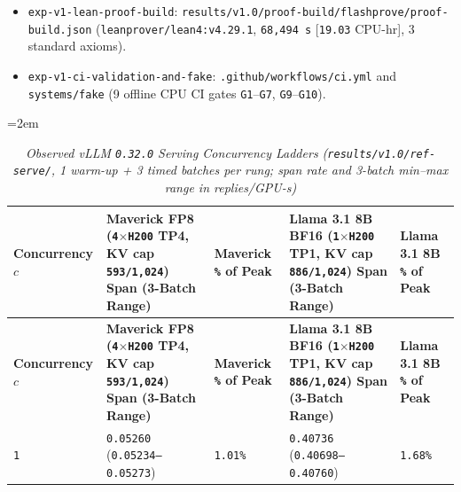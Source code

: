 \documentclass[11pt,letterpaper]{article}
\begin{document}
\begin{itemize}
\item \texttt{exp-\allowbreak{}v1-\allowbreak{}lean-\allowbreak{}proof-\allowbreak{}build}: \texttt{results/\allowbreak{}v1.0/\allowbreak{}proof-\allowbreak{}build/\allowbreak{}flashprove/\allowbreak{}proof-\allowbreak{}build.\allowbreak{}json} (\texttt{leanprover/\allowbreak{}lean4:\allowbreak{}v4.29.1}, \texttt{68,494 s} [\texttt{19.03} CPU-hr], 3 standard axioms).
\item \texttt{exp-\allowbreak{}v1-\allowbreak{}ci-\allowbreak{}validation-\allowbreak{}and-\allowbreak{}fake}: \texttt{.\allowbreak{}github/\allowbreak{}workflows/\allowbreak{}ci.\allowbreak{}yml} and \texttt{systems/\allowbreak{}fake} (9 offline CPU CI gates \texttt{G1}--\texttt{G7}, \texttt{G9}--\texttt{G10}).
\end{itemize}

{\footnotesize\setlength{\tabcolsep}{4pt}\emergencystretch=2em
\begin{longtable}{@{}>{\raggedright\arraybackslash}p{} >{\raggedright\arraybackslash}p{} >{\raggedright\arraybackslash}p{} >{\raggedright\arraybackslash}p{} >{\raggedright\arraybackslash}p{}@{}}
\caption{\textit{Observed vLLM \texttt{0.32.0} Serving Concurrency Ladders (\texttt{results/\allowbreak{}v1.0/\allowbreak{}ref-\allowbreak{}serve/}, 1 warm-up + 3 timed batches per rung; span rate and 3-batch min--max range in replies/GPU-s)} \cite{iproofs2026}} \\
\toprule
\textbf{Concurrency $c$} & \textbf{Maverick FP8 (\texttt{4$\times$H200} TP4, KV cap \texttt{593/\allowbreak{}1,024}) Span (3-Batch Range)} & \textbf{Maverick \texttt{\%} of Peak} & \textbf{Llama 3.1 8B BF16 (\texttt{1$\times$H200} TP1, KV cap \texttt{886/\allowbreak{}1,024}) Span (3-Batch Range)} & \textbf{Llama 3.1 8B \texttt{\%} of Peak} \\
\midrule
\endfirsthead
\toprule
\textbf{Concurrency $c$} & \textbf{Maverick FP8 (\texttt{4$\times$H200} TP4, KV cap \texttt{593/\allowbreak{}1,024}) Span (3-Batch Range)} & \textbf{Maverick \texttt{\%} of Peak} & \textbf{Llama 3.1 8B BF16 (\texttt{1$\times$H200} TP1, KV cap \texttt{886/\allowbreak{}1,024}) Span (3-Batch Range)} & \textbf{Llama 3.1 8B \texttt{\%} of Peak} \\
\midrule
\endhead
\bottomrule
\endfoot
\texttt{1} & \texttt{0.05260} (\texttt{0.05234--0.05273}) & \texttt{1.01\%} & \texttt{0.40736} (\texttt{0.40698--0.40760}) & \texttt{1.68\%} \\

\end{longtable}}
\end{document}
